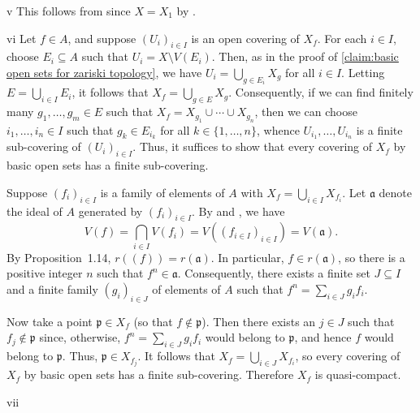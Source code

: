 \begin{partsolution}{v}
This follows from  since \(X = X_1\) by .
\end{partsolution}

\begin{partsolution}{vi}
Let \(f \in A\), and suppose \((U_i)_{i \in I}\) is an open covering of \(X_f\).
For each \(i \in I\), choose \(E_i \subseteq A\) such that \(U_i = X \setminus V(E_i)\).
Then, as in the proof of \autoref{claim:basic open sets for zariski topology}, we have \(U_i = \bigcup_{g \in E_i} X_g\) for all \(i \in I\).
Letting \(E = \bigcup_{i \in I} E_i\), it follows that \(X_f = \bigcup_{g \in E} X_g\).
Consequently, if we can find finitely many \(g_1, \ldots, g_m \in E\) such that \(X_f = X_{g_1} \cup \cdots \cup X_{g_n}\), then we can choose \(i_1, \ldots, i_n \in I\) such that \(g_k \in E_{i_k}\) for all \(k \in \{1, \ldots, n\}\), whence \(U_{i_1}, \ldots, U_{i_n}\) is a finite sub-covering of \((U_i)_{i \in I}\).
Thus, it suffices to show that every covering of \(X_f\) by basic open sets has a finite sub-covering.

Suppose \((f_i)_{i \in I}\) is a family of elements of \(A\) with \(X_f = \bigcup_{i \in I} X_{f_i}\).
Let \(\mathfrak{a}\) denote the ideal of \(A\) generated by \((f_i)_{i \in I}\).
By  and , we have
\begin{equation*}
V(f) = \bigcap_{i \in I} V(f_i) = V\left((f_{i \in I})_{i \in I}\right) = V(\mathfrak{a}).
\end{equation*}
By Proposition~1.14, \(r((f)) = r(\mathfrak{a})\).
In particular, \(f \in r(\mathfrak{a})\), so there is a positive integer \(n\) such that \(f^n \in \mathfrak{a}\).
Consequently, there exists a finite set \(J \subseteq I\) and a finite family \((g_i)_{i \in J}\) of elements of \(A\) such that \(f^n = \sum_{i \in J} g_i f_i\).

Now take a point \(\mathfrak{p} \in X_f\) (so that \(f \notin \mathfrak{p}\)).
Then there exists an \(j \in J\) such that \(f_j \notin \mathfrak{p}\) since, otherwise, \(f^n = \sum_{i \in J} g_i f_i\) would belong to \(\mathfrak{p}\), and hence \(f\) would belong to \(\mathfrak{p}\).
Thus, \(\mathfrak{p} \in X_{f_j}\).
It follows that \(X_f = \bigcup_{i \in J} X_{f_i}\), so every covering of \(X_f\) by basic open sets has a finite sub-covering.
Therefore \(X_f\) is quasi-compact.
\end{partsolution}

\begin{partsolution}{vii}

\end{partsolution}